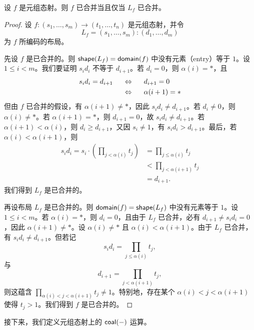 \begin{proposition}\label{coalescedmorphismcoalescedlayoutproposition}
    设 $f$ 是元组态射。则 $f$ 已合并当且仅当 $L_f$ 已合并。
\end{proposition}
\begin{proof} 设 $f:(s_1,\dots,s_m) \to (t_1,\dots,t_n)$ 是元组态射，并令
\[L_f = (s_1,\dots,s_m):(d_1,\dots,d_m)\]
为 $f$ 所编码的布局。

先设 $f$ 是已合并的。则 $\mathsf{shape}(L_f) = \mathsf{domain}(f)$ 中没有元素（entry）等于 $1$。设 $1 \leq i < m$。我们要证明 $s_id_i$ 不等于 $d_{i+1}$。若 $d_i = 0$，则 $\alpha(i) = *$，且
\begin{align*}
    s_id_i = d_{i+1} & \hspace{0.2in} \Leftrightarrow \hspace{0.2in} d_{i+1} = 0\\
    & \hspace{0.2in} \Leftrightarrow \hspace{0.2in} \alpha(i+1) = *
\end{align*}
但由 $f$ 已合并的假设，有 $\alpha(i+1) \neq *$，因此 $s_id_i \neq d_{i+1}$。若 $d_i \neq 0$，则 $\alpha(i) \neq *$。若 $\alpha(i+1) = *$，则 $d_{i+1} = 0$，故 $s_id_i \neq d_{i+1}$。若 $\alpha(i+1) < \alpha(i)$，则 $d_i \geq d_{i+1}$，又因 $s_i \neq 1$，有 $s_id_i > d_{i+1}$。最后，若 $\alpha(i) < \alpha(i+1)$，则
\begin{align*}
s_id_i = s_i \cdot \left( \prod_{j< \alpha(i)} t_j\right) & = \prod_{j \leq \alpha(i)} t_j \\
& < \prod_{j < \alpha(i+1)} t_j\\
& = d_{i+1}.
\end{align*}
我们得到 $L_f$ 是已合并的。

再设布局 $L_f$ 是已合并的。则 $\mathsf{domain}(f) = \mathsf{shape}(L_f)$ 中没有元素等于 $1$。设 $1 \leq i < m$。若 $\alpha(i) = *$，则 $d_i = 0$，且由于 $L_f$ 已合并，必有 $d_{i+1} \neq s_id_i = 0$，因此 $\alpha(i+1) \neq *$。设 $\alpha(i) \neq *$ 且 $\alpha(i)<\alpha(i+1)$。由于 $L_f$ 已合并，有 $s_id_i \neq d_{i+1}$。但若记
\[
s_i d_i = \prod_{j \leq \alpha(i)} t_j,
\]
与
\[
d_{i+1} = \prod_{j<\alpha(i+1)} t_j,
\]
则这蕴含 $\prod_{\alpha(i) < j < \alpha(i+1)}t_j \neq 1$。特别地，存在某个 $\alpha(i)<j<\alpha(i+1)$ 使得 $t_j >1$。我们得到 $f$ 是已合并的。
\end{proof}

接下来，我们定义元组态射上的 $\mathsf{coal}(-)$ 运算。


